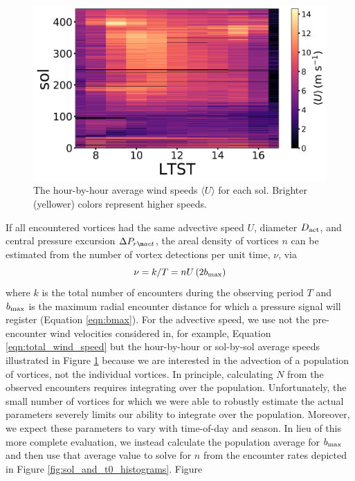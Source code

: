 \documentclass{aastex63}
\begin{document}
\begin{figure}
    \centering
    \includegraphics[width=\textwidth]{figures/advective_speeds.png}
    \caption{The hour-by-hour average wind speeds $\langle U \rangle$ for each sol. Brighter (yellower) colors represent higher speeds.}
    \label{fig:advective_speeds}
\end{figure}

If all encountered vortices had the same advective speed $U$, diameter $D_{\rm act}$, and central pressure excursion $\Delta P_{r\m act}$, the areal density of vortices $n$ can be estimated from the number of vortex detections per unit time, $\nu$, via
\begin{equation}
    \nu = k/T = n U \left( 2 b_{\rm max} \right) \label{eqn:simple_number_of_encounters}
\end{equation}
where $k$ is the total number of encounters during the observing period $T$ and $b_{\rm max}$ is the maximum radial encounter distance for which a pressure signal will register (Equation \ref{eqn:bmax}). For the advective speed, we use not the pre-encounter wind velocities considered in, for example, Equation \ref{eqn:total_wind_speed} but the hour-by-hour or sol-by-sol average speeds illustrated in Figure \ref{fig:advective_speeds} because we are interested in the advection of a population of vortices, not the individual vortices. In principle, calculating $N$ from the observed encounters requires integrating over the population. Unfortunately, the small number of vortices for which we were able to robustly estimate the actual parameters severely limits our ability to integrate over the population.  Moreover, we expect these parameters to vary with time-of-day and season. In lieu of this more complete evaluation, we instead calculate the population average for $b_{\rm max}$ and then use that average value to solve for $n$ from the encounter rates depicted in Figure \ref{fig:sol_and_t0_histograms}. Figure  
\end{document}
